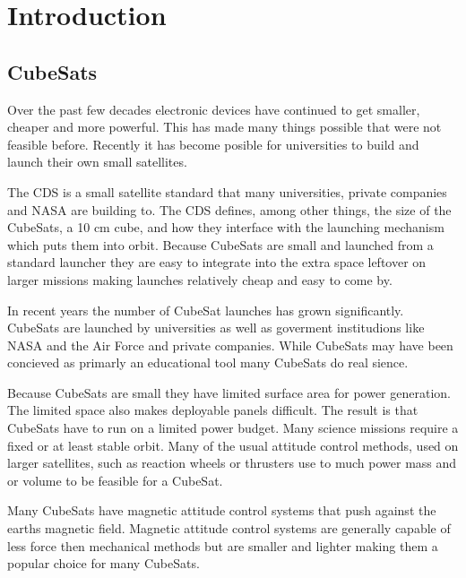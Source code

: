 

\chapter{Introduction}


\section{CubeSats}

Over the past few decades electronic devices have continued to get smaller, cheaper and more powerful. This has made many things possible that were not feasible before. Recently it has become posible for universities to build and launch their own small satellites.

The \acf{CDS} is a small satellite standard that many universities, private companies and NASA are building to. The \ac{CDS} defines, among other things, the size of the CubeSats, a 10 cm cube, and how they interface with the launching mechanism which puts them into orbit. Because CubeSats are small and launched from a standard launcher they are easy to integrate into the extra space leftover on larger missions making launches relatively cheap and easy to come by.

In recent years the number of CubeSat launches has grown significantly. CubeSats are launched by universities as well as goverment institudions like NASA and the Air Force and private companies. While CubeSats may have been concieved as primarly an educational tool many CubeSats do real sience. 

Because CubeSats are small they have limited surface area for power generation. The limited space also makes deployable panels difficult. The result is that CubeSats have to run on a limited power budget. Many science missions require a fixed or at least stable orbit. Many of the usual attitude control methods, used on larger satellites, such as reaction wheels or thrusters use to much power mass and or volume to be feasible for a CubeSat.

Many CubeSats have magnetic attitude control systems that push against the earths magnetic field. Magnetic attitude control systems are generally capable of less force then mechanical methods but are smaller and lighter making them a popular choice for many CubeSats.

